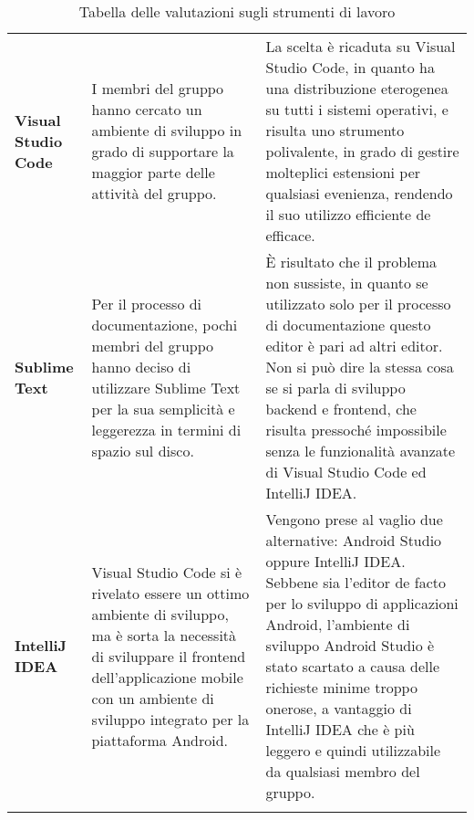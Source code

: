 \documentclass[../piano-di-qualifica.tex]{subfiles}
\begin{document}
\begin{longtable}[H]{>{\centering\bfseries}m{3cm} >{\centering\arraybackslash}m{6.5cm} >{\centering\arraybackslash}m{6.8cm}}
  Visual Studio Code                & I membri del gruppo hanno cercato un ambiente di sviluppo in grado di supportare la maggior parte delle attività del gruppo.                                                                                                                                     & La scelta è ricaduta su Visual Studio Code, in quanto ha una distribuzione eterogenea su tutti i sistemi operativi, e risulta uno strumento polivalente, in grado di gestire molteplici estensioni per qualsiasi evenienza, rendendo il suo utilizzo efficiente de efficace.                                                                                      \\
  Sublime Text                      & Per il processo di documentazione, pochi membri del gruppo hanno deciso di utilizzare Sublime Text per la sua semplicità e leggerezza in termini di spazio sul disco.                                                                                            & È risultato che il problema non sussiste, in quanto se utilizzato solo per il processo di documentazione questo editor è pari ad altri editor. Non si può dire la stessa cosa se si parla di sviluppo backend e frontend, che risulta pressoché impossibile senza le funzionalità avanzate di Visual Studio Code ed IntelliJ IDEA\@.                              \\
  IntelliJ IDEA                     & Visual Studio Code si è rivelato essere un ottimo ambiente di sviluppo, ma è sorta la necessità di sviluppare il frontend dell'applicazione mobile con un ambiente di sviluppo integrato per la piattaforma Android.                                             & Vengono prese al vaglio due alternative: Android Studio oppure IntelliJ IDEA\@. Sebbene sia l'editor de facto per lo sviluppo di applicazioni Android, l'ambiente di sviluppo Android Studio è stato scartato a causa delle richieste minime troppo onerose, a vantaggio di IntelliJ IDEA che è più leggero e quindi utilizzabile da qualsiasi membro del gruppo. \\
  \rowcolor{white}
  \caption{Tabella delle valutazioni sugli strumenti di lavoro}%
  \label{tab:tabella_valutazioni_strumenti}
\end{longtable}
\end{document}

